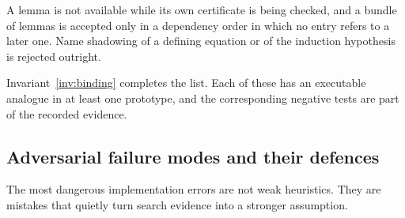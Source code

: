 \begin{invariant}
A lemma is not available while its own certificate is being checked, and a
bundle of lemmas is accepted only in a dependency order in which no entry
refers to a later one. Name shadowing of a defining equation or of the
induction hypothesis is rejected outright.
\end{invariant}

Invariant~\ref{inv:binding} completes the list. Each of these has an
executable analogue in at least one prototype, and the corresponding negative
tests are part of the recorded evidence.

\subsection{Adversarial failure modes and their defences}

The most dangerous implementation errors are not weak heuristics. They are
mistakes that quietly turn search evidence into a stronger assumption.


